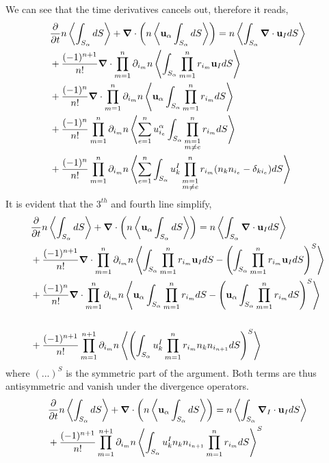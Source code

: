 We can see that the time derivatives cancels out, therefore it reads, 
\begin{align*}
    &\frac{\partial}{\partial t} n \left<\int_{S_\alpha} dS\right>
     + \bm{\nabla} \cdot \left(
         n \left<\textbf{u}_\alpha \int_{S_\alpha} dS\right> 
    \right)
    = n \left<\int_{S_\alpha} \bm{\nabla} \cdot \textbf{u}_I dS\right> \\
    &+ \frac{(-1)^{n+1}}{n!}
    \bm{\nabla}\cdot\prod^{n}_{m=1}
    \partial_{i_m}
    n \left<
    \int_{S_\alpha}
    \prod_{m=1}^{n} r_{i_m} \textbf{u}_IdS\right>\\
    &+ \frac{(-1)^{n}}{n!}
    \bm{\nabla} \cdot
    \prod^{n}_{m=1}
    \partial_{i_m}
    n \left<
     \textbf{u}_\alpha \int_{S_\alpha} \prod_{m=1}^{n} r_{i_m}dS \right>\\
    & + \frac{(-1)^{n}}{n!}
    \prod^{n}_{m=1}
    \partial_{i_m}
    n \left<
    \sum_{e=1}^n u^\alpha_{i_e} \int_{S_\alpha} 
    \prod_{\substack{m = 1 \\m \neq e}}^{n} r_{i_m}dS\right> \\
    & +  \frac{(-1)^{n}}{n!}
    \prod^{n}_{m=1}
    \partial_{i_m}
    n \left<
    \sum_{e=1}^n \int_{S_\alpha} u^I_k
    \prod_{\substack{m = 1 \\m \neq e}}^{n} r_{i_m}
    (n_kn_{i_e} - \delta_{ki_e}) dS\right>
\end{align*}
It is evident that the $3^{th}$ and fourth line simplify, 
\begin{align*}
    &\frac{\partial}{\partial t} n \left<\int_{S_\alpha} dS\right>
     + \bm{\nabla} \cdot \left(
         n \left<\textbf{u}_\alpha \int_{S_\alpha} dS\right> 
    \right)
    = n \left<\int_{S_\alpha} \bm{\nabla} \cdot \textbf{u}_I dS\right> \\
    &+ \frac{(-1)^{n+1}}{n!}
    \bm{\nabla}\cdot\prod^{n}_{m=1}
    \partial_{i_m}
    n \left<
    \int_{S_\alpha}
    \prod_{m=1}^{n} r_{i_m} \textbf{u}_IdS - 
    \left(
        \int_{S_\alpha}
        \prod_{m=1}^{n} r_{i_m} \textbf{u}_IdS
    \right)^S\right>\\
    &+ \frac{(-1)^{n}}{n!}
    \bm{\nabla} \cdot
    \prod^{n}_{m=1}
    \partial_{i_m}
    n \left<
     \textbf{u}_\alpha \int_{S_\alpha} \prod_{m=1}^{n} r_{i_m}dS 
     - \left(\textbf{u}_\alpha \int_{S_\alpha} \prod_{m=1}^{n} r_{i_m} dS\right)^S \right>\\\\
    & +  \frac{(-1)^{n+1}}{n!}
    \prod^{n+1}_{m=1}
    \partial_{i_m}
    n \left<\left(\int_{S_\alpha} u^I_k
    \prod_{m=1}^{n} r_{i_m} n_kn_{i_{n+1}}  dS\right)^S\right>
\end{align*}
where $(...)^S$ is the symmetric part of the argument. 
Both terms are thus antisymmetric and vanish under the divergence operators. 
\begin{align*}
    &\frac{\partial}{\partial t} n \left<\int_{S_\alpha} dS\right>
     + \bm{\nabla} \cdot \left(
         n \left<\textbf{u}_\alpha \int_{S_\alpha} dS\right> 
    \right)
    = n \left<\int_{S_\alpha} \bm{\nabla}_I \cdot \textbf{u}_I dS\right> \\
    & +  \frac{(-1)^{n+1}}{n!}
    \prod^{n+1}_{m=1}
    \partial_{i_m}
    n \left<\int_{S_\alpha} u^I_k n_kn_{i_{n+1}} \prod_{m=1}^{n} r_{i_m} dS\right>^S
\end{align*}

